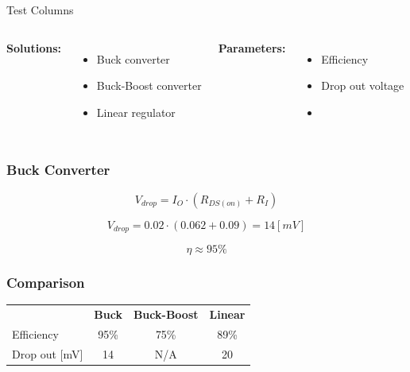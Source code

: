 \documentclass[mathserif]{beamer}
\begin{document}

\begin{frame}[c]{Test Columns}
\begin{columns}
\textbf{Solutions:}   
\begin{itemize}
			\item Buck converter
			\item Buck-Boost converter
			\item Linear regulator
\end{itemize}
\textbf{Parameters:}
\begin{itemize}
			\item Efficiency
			\item Drop out voltage
			\item []
\end{itemize}
\end{columns}
\end{frame}

\begin{frame}[c]\frametitle{Buck Converter}
	\begin{equation}
		V_{drop} = I_{O} \cdot (R_{DS(on)}+R_I)
		\label{eq:drop_v_tps62}
	\end{equation}

	\begin{equation}
		V_{drop} = 0.02 \cdot (0.062+0.09) = 14 [mV]
		\label{eq:drop_v_tps62_2}
	\end{equation}

	\begin{equation}
		\eta \approx 95\%
	\end{equation}
\end{frame}

\begin{frame}[c]\frametitle{Comparison}
	\begin{table}[h]
		\begin{tabular}{l|c|c|c}
			  ~				& \textbf{Buck} 	& \textbf{Buck-Boost}& \textbf{Linear}\tabularnewline 
			 Efficiency  	& 95\% 	& 75\%		& 89\%	\\
			 Drop out [mV]	& 14  	& N/A		& 20	\\
		\end{tabular}
	\end{table}
\end{frame}
\end{document}
